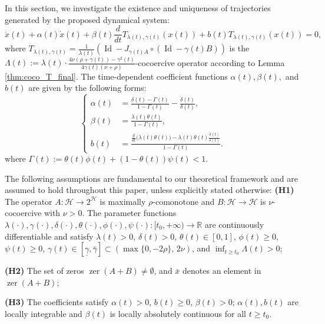 \documentclass{article}
\theoremstyle{definition}
\theoremstyle{definition}
\theoremstyle{definition}
\begin{document}
In this section, we investigate the existence and uniqueness of trajectories generated by the proposed dynamical system:
\begin{equation}
\label{eq:SHDS}
\ddot{x}(t) + \alpha(t)\dot{x}(t) + \beta(t)\frac{d}{dt}T_{\lambda(t), \gamma(t)}(x(t)) + b(t)T_{\lambda(t), \gamma(t)}(x(t)) = 0,
\end{equation}
where $T_{\lambda(t), \gamma(t)} = \frac{1}{\lambda(t)}(\operatorname{Id} - J_{\gamma(t) A} \circ (\operatorname{Id} - \gamma(t) B))$ is the $\Lambda(t) := \lambda(t) \cdot \frac{4\nu \left( \rho + \gamma(t) \right) - \gamma^2(t)}{4\gamma(t) \left( \nu + \rho \right)}$-cocoercive operator according to Lemma \ref{thm:coco_T_final}. The time-dependent coefficient functions $\alpha(t), \beta(t),$ and $b(t)$ are given by the following forms:
\begin{equation}\label{eq:coefficients_definition}
\left\{
\begin{aligned}
\alpha(t) &= \frac{\delta(t) - \dot{\Gamma}(t)}{1 - \Gamma(t)} - \frac{\dot{\delta}(t)}{\delta(t)}, \\
\beta(t) &= \frac{\lambda(t) \theta(t)}{1 - \Gamma(t)}, \\
b(t) &= \frac{\frac{d}{dt}\big(\lambda(t)\theta(t)\big) - \lambda(t)\theta(t) \frac{\dot{\delta}(t)}{\delta(t)}}{1 - \Gamma(t)}.
\end{aligned}
\right.
\end{equation}
where $\Gamma(t) := \theta(t)\phi(t)+(1-\theta(t))\psi(t)<1$.

The following assumptions are fundamental to our theoretical framework and are assumed to hold throughout this paper, unless explicitly stated otherwise:
\vskip 2mm
{\bf (H1)} The operator $A: \mathcal{H} \to 2^{\mathcal{H}}$ is maximally $\rho$-comonotone and $B: \mathcal{H} \to \mathcal{H}$ is $\nu$-cocoercive with $\nu > 0$. The parameter functions $\lambda(\cdot), \gamma(\cdot), \delta(\cdot), \theta(\cdot), \phi(\cdot), \psi(\cdot): [t_0, +\infty) \to \mathbb{R}$ are continuously differentiable and satisfy $\lambda(t) > 0$, $\delta(t) > 0$, $\theta(t) \in [0,1]$, $\phi(t) \ge 0$, $\psi(t) \ge 0$, $\gamma(t) \in [\underline{\gamma}, \bar{\gamma}] \subset \left( \max\{0, -2\rho\}, \, 2\nu \right)$, and $\inf_{t \geq t_0} \Lambda(t) > 0$;
\vskip 1mm

{\bf (H2)} The set of zeros $\operatorname{zer}(A+B) \neq \emptyset$, and $\bar{x}$ denotes an element in $\operatorname{zer}(A+B)$;
\vskip 1mm

{\bf (H3)} The coefficients satisfy $\alpha(t) > 0$, $b(t) \ge 0$, $\beta(t) > 0$; $\alpha(t), b(t)$ are locally integrable and $\beta(t)$ is locally absolutely continuous for all $t \ge t_0$.
\vskip 1mm
\end{document}
